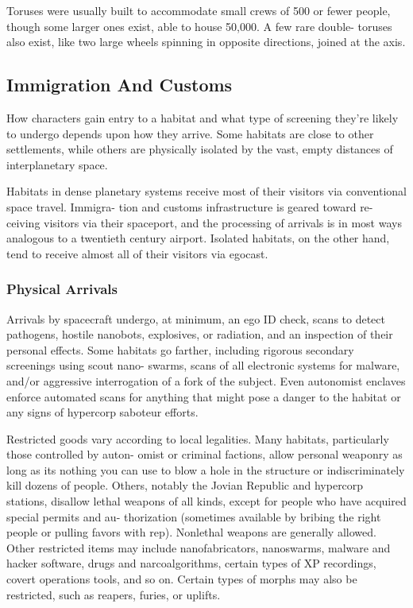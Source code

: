 Toruses were usually built to accommodate small 
crews of 500 or fewer people, though some larger 
ones exist, able to house 50,000. A few rare double-
toruses also exist, like two large wheels spinning in 
opposite directions, joined at the axis.

\subsection{Immigration And Customs}

How characters gain entry to a habitat and what type 
of screening they're likely to undergo depends upon 
how they arrive. Some habitats are close to other 
settlements, while others are physically isolated by the 
vast, empty distances of interplanetary space.

Habitats in dense planetary systems receive most of 
their visitors via conventional space travel. Immigra-
tion and customs infrastructure is geared toward re-
ceiving visitors via their spaceport, and the processing 
of arrivals is in most ways analogous to a twentieth 
century airport. Isolated habitats, on the other hand, 
tend to receive almost all of their visitors via egocast.

\subsubsection{Physical Arrivals}

Arrivals by spacecraft undergo, at minimum, an ego 
ID check, scans to detect pathogens, hostile nanobots, 
explosives, or radiation, and an inspection of their 
personal effects. Some habitats go farther, including 
rigorous secondary screenings using scout nano-
swarms, scans of all electronic systems for malware, 
and/or aggressive interrogation of a fork of the subject. 
Even autonomist enclaves enforce automated scans for 
anything that might pose a danger to the habitat or 
any signs of hypercorp saboteur efforts.

Restricted goods vary according to local legalities. 
Many habitats, particularly those controlled by auton-
omist or criminal factions, allow personal weaponry 
as long as its nothing you can use to blow a hole in 
the structure or indiscriminately kill dozens of people. 
Others, notably the Jovian Republic and hypercorp 
stations, disallow lethal weapons of all kinds, except 
for people who have acquired special permits and au-
thorization (sometimes available by bribing the right 
people or pulling favors with rep). Nonlethal weapons 
are generally allowed. Other restricted items may 
include nanofabricators, nanoswarms, malware and 
hacker software, drugs and narcoalgorithms, certain 
types of XP recordings, covert operations tools, and 
so on. Certain types of morphs may also be restricted, 
such as reapers, furies, or uplifts.

